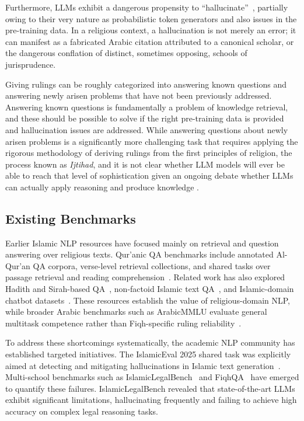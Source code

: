 \documentclass[runningheads]{llncs}
\begin{document}
Furthermore, LLMs exhibit a dangerous propensity to ``hallucinate''~\cite{lin2021truthfulqa,islamicEval2025}, partially owing to their very nature as probabilistic token generators and also issues in the pre-training data. In a religious context, a hallucination is not merely an error; it can manifest as a fabricated Arabic citation attributed to a canonical scholar, or the dangerous conflation of distinct, sometimes opposing, schools of jurisprudence.

Giving rulings can be roughly categorized into answering known questions and answering newly arisen problems that have not been previously addressed. Answering known questions is fundamentally a problem of knowledge retrieval, and these should be possible to solve if the right pre-training data is provided and hallucination issues are addressed. While answering questions about newly arisen problems is a significantly more challenging task that requires applying the rigorous methodology of deriving rulings from the first principles of religion, the process known as \textit{Ijtihad}, and it is not clear whether LLM models will ever be able to reach that level of sophistication given an ongoing debate whether LLMs can actually apply reasoning and produce knowledge \cite{illusion-of-thinking}.

\subsection{Existing Benchmarks}
Earlier Islamic NLP resources have focused mainly on retrieval and question answering over religious texts. Qur'anic QA benchmarks include annotated Al-Qur'an QA corpora, verse-level retrieval collections, and shared tasks over passage retrieval and reading comprehension~\cite{alqahtani2018annotated,malhas2020ayatec,malhas2023quranqa}. Related work has also explored Hadith and Sirah-based QA~\cite{wiharja2022questions,rizqullah2023qasina}, non-factoid Islamic text QA~\cite{qamar2024benchmark}, and Islamic-domain chatbot datasets~\cite{mohammed2022english}. These resources establish the value of religious-domain NLP, while broader Arabic benchmarks such as ArabicMMLU evaluate general multitask competence rather than Fiqh-specific ruling reliability~\cite{koto2024arabicmmlu}.

To address these shortcomings systematically, the academic NLP community has established targeted initiatives. The IslamicEval 2025 shared task was explicitly aimed at detecting and mitigating hallucinations in Islamic text generation~\cite{islamicEval2025}. Multi-school benchmarks such as IslamicLegalBench~\cite{elmahjub2026islamiclegalbench} and FiqhQA~\cite{atif2025fiqhqa} have emerged to quantify these failures. IslamicLegalBench revealed that state-of-the-art LLMs exhibit significant limitations, hallucinating frequently and failing to achieve high accuracy on complex legal reasoning tasks.
\end{document}
